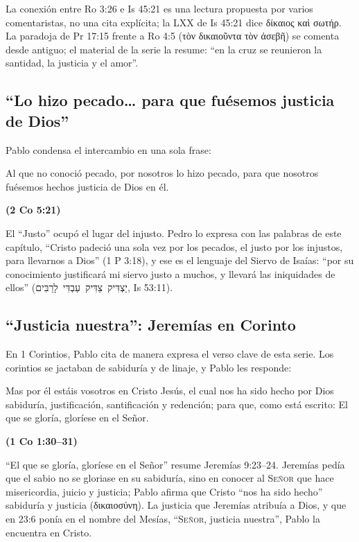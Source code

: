 \documentclass[11pt,letterpaper]{article}
\newcommand{\heb}[1]{\mbox{\foreignlanguage{hebrew}{#1}}}
\newcommand{\grc}[1]{\foreignlanguage{ancientgreek}{#1}}
\newcommand{\SENOR}{\textsc{Señor}}
\newcommand{\fuente}[1]{\par\hfill{\upshape\bfseries\small\textcolor{azul}{#1}}}
\begin{document}
\begin{nota}[Precisión]
La conexión entre Ro 3:26 e Is 45:21 es una lectura propuesta por varios comentaristas, no una cita explícita; la LXX de Is 45:21 dice \grc{δίκαιος καὶ σωτήρ}. La paradoja de Pr 17:15 frente a Ro 4:5 (\grc{τὸν δικαιοῦντα τὸν ἀσεβῆ}) se comenta desde antiguo; el material de la serie la resume: ``en la cruz se reunieron la santidad, la justicia y el amor''.
\end{nota}

\subsection{``Lo hizo pecado\ldots{} para que fuésemos justicia de Dios''}
Pablo condensa el intercambio en una sola frase:

\begin{cita}Al que no conoció pecado, por nosotros lo hizo pecado, para que nosotros fuésemos hechos justicia de Dios en él.\fuente{(2 Co 5:21)}\end{cita}

El ``Justo'' ocupó el lugar del injusto. Pedro lo expresa con las palabras de este capítulo, ``Cristo padeció una sola vez por los pecados, el justo por los injustos, para llevarnos a Dios'' (1 P 3:18), y ese es el lenguaje del Siervo de Isaías: ``por su conocimiento justificará mi siervo justo a muchos, y llevará las iniquidades de ellos'' (\heb{יַצְדִּיק צַדִּיק עַבְדִּי לָרַבִּים}, Is 53:11).

\subsection{``Justicia nuestra'': Jeremías en Corinto}
En 1 Corintios, Pablo cita de manera expresa el verso clave de esta serie. Los corintios se jactaban de sabiduría y de linaje, y Pablo les responde:

\begin{cita}Mas por él estáis vosotros en Cristo Jesús, el cual nos ha sido hecho por Dios sabiduría, justificación, santificación y redención; para que, como está escrito: El que se gloría, gloríese en el Señor.\fuente{(1 Co 1:30--31)}\end{cita}

``El que se gloría, gloríese en el Señor'' resume Jeremías 9:23--24. Jeremías pedía que el sabio no se gloriase en su sabiduría, sino en conocer al \SENOR{} que hace misericordia, juicio y justicia; Pablo afirma que Cristo ``nos ha sido hecho'' sabiduría y justicia (\grc{δικαιοσύνη}). La justicia que Jeremías atribuía a Dios, y que en 23:6 ponía en el nombre del Mesías, ``\SENOR, justicia nuestra'', Pablo la encuentra en Cristo.
\end{document}
